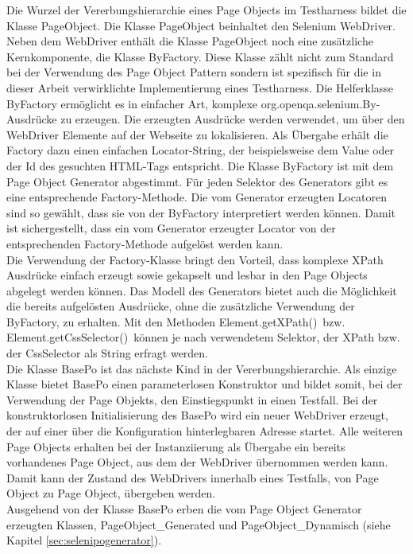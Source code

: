Die Wurzel der Vererbungshierarchie eines Page Objects im Testharness bildet die Klasse PageObject. Die Klasse PageObject beinhaltet den Selenium WebDriver. Neben dem WebDriver enthält die Klasse PageObject noch eine zusätzliche Kernkomponente, die Klasse ByFactory. Diese Klasse zählt nicht zum Standard bei der Verwendung des Page Object Pattern sondern ist spezifisch für die in dieser Arbeit verwirklichte Implementierung eines Testharness.
Die Helferklasse ByFactory ermöglicht es in einfacher Art, komplexe \grq org.openqa.selenium.By\grq -Ausdrücke zu erzeugen. Die erzeugten Ausdrücke werden verwendet, um über den WebDriver Elemente auf der Webseite zu lokalisieren. Als Übergabe erhält die Factory dazu einen einfachen Locator-String, der beispielsweise dem Value oder der Id des gesuchten HTML-Tags entspricht. Die Klasse ByFactory ist mit dem Page Object Generator abgestimmt. Für jeden Selektor des Generators gibt es eine entsprechende Factory-Methode. Die vom Generator erzeugten Locatoren sind so gewählt, dass sie von der ByFactory interpretiert werden können. Damit ist sichergestellt, dass ein vom Generator erzeugter Locator von der entsprechenden Factory-Methode aufgelöst werden kann.\\
Die Verwendung der Factory-Klasse bringt den Vorteil, dass komplexe XPath Ausdrücke einfach erzeugt sowie gekapselt und lesbar in den Page Objects abgelegt werden können. 
Das Modell des Generators bietet auch die Möglichkeit die bereits aufgelösten Ausdrücke, ohne die zusätzliche Verwendung der ByFactory, zu erhalten.
Mit den Methoden  \grq Element.getXPath()\grq\ bzw.  \grq Element.getCssSelector()\grq\ können je nach verwendetem Selektor, der XPath bzw. der CssSelector als String erfragt werden. \\
Die Klasse BasePo ist das nächste Kind in der Vererbungshierarchie. Als einzige Klasse bietet BasePo einen parameterlosen Konstruktor und bildet somit, bei der Verwendung der Page Objekts, den Einstiegspunkt in einen Testfall. Bei der konstruktorlosen Initialisierung des BasePo wird ein neuer WebDriver erzeugt, der auf einer über die Konfiguration hinterlegbaren Adresse startet.
Alle weiteren Page Objects erhalten bei der Instanziierung als Übergabe ein bereits vorhandenes Page Object, aus dem der WebDriver übernommen werden kann.
Damit kann der Zustand des WebDrivers innerhalb eines Testfalls, von Page Object zu Page Object, übergeben werden.\\
Ausgehend von der Klasse BasePo erben die vom Page Object Generator erzeugten Klassen, PageObject\_Generated und PageObject\_Dynamisch (siehe Kapitel \ref{sec:selenipogenerator}).
